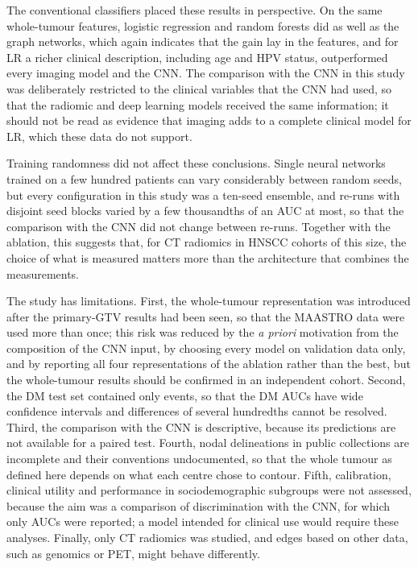 \documentclass[11pt,a4paper]{article}
\begin{document}
The conventional classifiers placed these results in perspective. On the same whole-tumour features, logistic regression and random forests did as well as the graph networks, which again indicates that the gain lay in the features, and for LR a richer clinical description, including age and HPV status, outperformed every imaging model and the CNN. The comparison with the CNN in this study was deliberately restricted to the clinical variables that the CNN had used, so that the radiomic and deep learning models received the same information; it should not be read as evidence that imaging adds to a complete clinical model for LR, which these data do not support.

Training randomness did not affect these conclusions. Single neural networks trained on a few hundred patients can vary considerably between random seeds, but every configuration in this study was a ten-seed ensemble, and re-runs with disjoint seed blocks varied by a few thousandths of an AUC at most, so that the comparison with the CNN did not change between re-runs. Together with the ablation, this suggests that, for CT radiomics in HNSCC cohorts of this size, the choice of what is measured matters more than the architecture that combines the measurements.

The study has limitations. First, the whole-tumour representation was introduced after the primary-GTV results had been seen, so that the MAASTRO data were used more than once; this risk was reduced by the \emph{a priori} motivation from the composition of the CNN input, by choosing every model on validation data only, and by reporting all four representations of the ablation rather than the best, but the whole-tumour results should be confirmed in an independent cohort. Second, the DM test set contained only \eTestDM{} events, so that the DM AUCs have wide confidence intervals and differences of several hundredths cannot be resolved. Third, the comparison with the CNN is descriptive, because its predictions are not available for a paired test. Fourth, nodal delineations in public collections are incomplete and their conventions undocumented, so that the whole tumour as defined here depends on what each centre chose to contour. Fifth, calibration, clinical utility and performance in sociodemographic subgroups were not assessed, because the aim was a comparison of discrimination with the CNN, for which only AUCs were reported; a model intended for clinical use would require these analyses. Finally, only CT radiomics was studied, and edges based on other data, such as genomics or PET, might behave differently.
\end{document}
